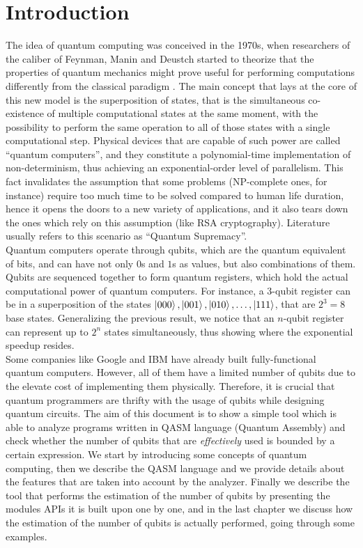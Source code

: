 \documentclass[12pt,a4paper]{report}
\theoremstyle{definition}
\theoremstyle{definition}
\theoremstyle{definition}
\begin{document}
\chapter{Introduction}
The idea of quantum computing was conceived in the 1970s, when researchers of the caliber of Feynman, Manin and Deustch started to theorize that the properties of quantum mechanics might prove useful for performing computations differently from the classical paradigm \cite{zuw}. The main concept that lays at the core of this new model is the superposition of states, that is the simultaneous co-existence of multiple computational states at the same moment, with the possibility to perform the same operation to all of those states with a single computational step. Physical devices that are capable of such power are called ``quantum computers'', and they constitute a polynomial-time implementation of non-determinism, thus achieving an exponential-order level of parallelism. This fact invalidates the assumption that some problems (NP-complete ones, for instance) require too much time to be solved compared to human life duration, hence it opens the doors to a new variety of applications, and it also tears down the ones which rely on this assumption (like RSA cryptography). Literature usually refers to this scenario as ``Quantum Supremacy''.\\
Quantum computers operate through qubits, which are the quantum equivalent of bits, and can have not only $0$s and $1$s as values, but also combinations of them. Qubits are sequenced together to form quantum registers, which hold the actual computational power of quantum computers. For instance, a 3-qubit register can be in a superposition of the states $\ket{000}, \ket{001}, \ket{010}, \ldots, \ket{111}$, that are $2^3=8$ base states. Generalizing the previous result, we notice that an $n$-qubit register can represent up to $2^n$ states simultaneously, thus showing where the exponential speedup resides.\\
Some companies like Google and IBM have already built fully-functional quantum computers. However, all of them have a limited number of qubits due to the elevate cost of implementing them physically. Therefore, it is crucial that quantum programmers are thrifty with the usage of qubits while designing quantum circuits. The aim of this document is to show a simple tool which is able to analyze programs written in QASM language (Quantum Assembly) and check whether the number of qubits that are \textit{effectively} used is bounded by a certain expression.
We start by introducing some concepts of quantum computing, then we describe the QASM language and we provide details about the features that are taken into account by the analyzer. Finally we describe the tool that performs the estimation of the number of qubits by presenting the modules APIs it is built upon one by one, and in the last chapter we discuss how the estimation of the number of qubits is actually performed, going through some examples.\\
\end{document}
